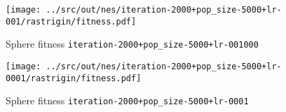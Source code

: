 \begin{figure}[H]
	\centering
	\begin{minipage}[b]{.6\textwidth}
		\texttt{[image: ../src/out/nes/iteration-2000+pop\_size-5000+lr-001/rastrigin/fitness.pdf]}	
	\end{minipage}
	\caption{Sphere fitness \texttt{iteration-2000+pop\_size-5000+lr-001000}}
	\label{fig:nes-r-fitness/001}
\end{figure}
\begin{figure}[H]
	\centering
	\begin{minipage}[b]{.6\textwidth}
		\texttt{[image: ../src/out/nes/iteration-2000+pop\_size-5000+lr-0001/rastrigin/fitness.pdf]}	
	\end{minipage}
	\caption{Sphere fitness \texttt{iteration-2000+pop\_size-5000+lr-0001}}
	\label{fig:nes-r-fitness/0001}
\end{figure}